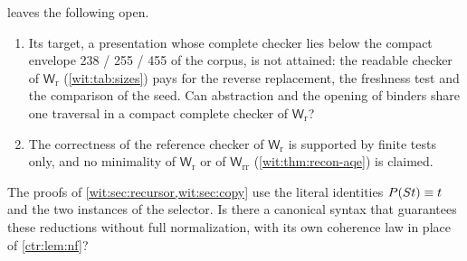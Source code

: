 \begin{question}
\label{wit:q:recon}
 leaves the following open.
\begin{enumerate}[label=\textup{(\roman*)}]
\item Its target, a presentation whose complete checker lies below the
 compact envelope 238 / 255 / 455 of the corpus, is not attained: the
 readable checker of $\mathsf{W}_{\mathrm r}$ (\cref{wit:tab:sizes}) pays for
 the reverse replacement, the freshness test and the comparison of the seed.
 Can abstraction and the opening of binders share one traversal in a compact
 complete checker of $\mathsf{W}_{\mathrm r}$?
\item The correctness of the reference checker of $\mathsf{W}_{\mathrm r}$ is
 supported by finite tests only, and no minimality of $\mathsf{W}_{\mathrm r}$
 or of $\mathsf{W}_{\mathrm{rr}}$ (\cref{wit:thm:recon-aqe}) is claimed.
\end{enumerate}
\end{question}

\begin{question}
The proofs of \cref{wit:sec:recursor,wit:sec:copy} use the literal
identities $P(S t)\equiv t$ and the two instances of the selector.  Is
there a canonical syntax that guarantees these reductions without full
normalization, with its own coherence law in place of \cref{ctr:lem:nf}?
\end{question}

